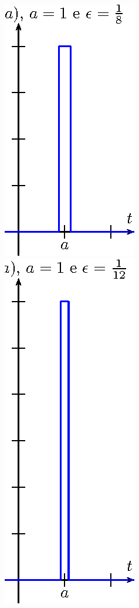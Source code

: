 \begin{figure}[!ht]
\begin{center}
\includegraphics{cap_dirac_conv/pics/figura_4}\hspace{20pt}
\includegraphics{cap_dirac_conv/pics/figura_5}\hspace{20pt}

\end{center}
\end{figure}
